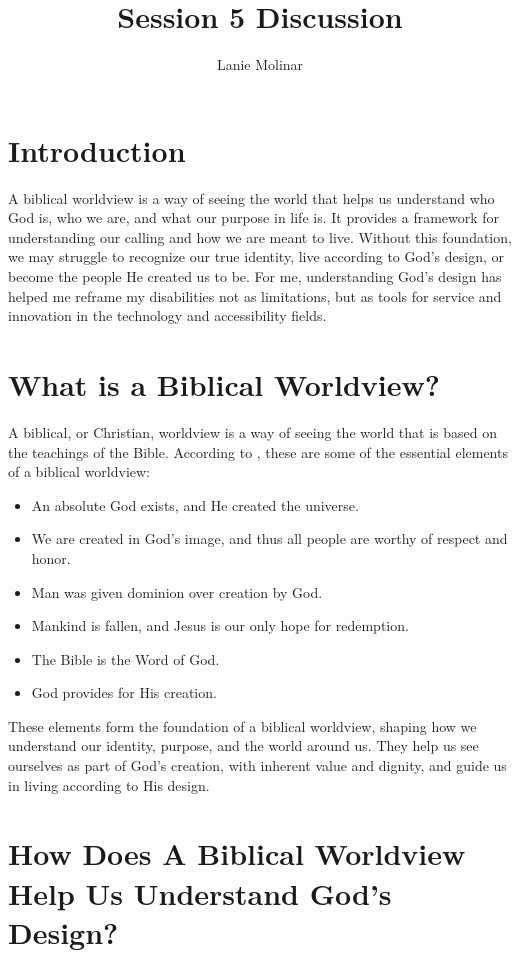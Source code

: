 \documentclass[stu,12pt,floatsintext]{apa7}
\title{Session 5 Discussion}
\author{Lanie Molinar}
\begin{document}
\maketitle
\thispagestyle{plain}
\pagestyle{plain}

\section{Introduction}

A biblical worldview is a way of seeing the world that helps us understand who God is, who we are, and what our purpose in life is. It provides a framework for understanding our calling and how we are meant to live. Without this foundation, we may struggle to recognize our true identity, live according to God’s design, or become the people He created us to be. For me, understanding God’s design has helped me reframe my disabilities not as limitations, but as tools for service and innovation in the technology and accessibility fields.

\section{What is a Biblical Worldview?}

A biblical, or Christian, worldview is a way of seeing the world that is based on the teachings of the Bible. According to \textcite{slickWhatAreChristian2008}, these are some of the essential elements of a biblical worldview:
\begin{itemize}
    \item An absolute God exists, and He created the universe.
    \item We are created in God's image, and thus all people are worthy of respect and honor.
    \item Man was given dominion over creation by God.
    \item Mankind is fallen, and Jesus is our only hope for redemption.
    \item The Bible is the Word of God.
    \item God provides for His creation.
\end{itemize}

These elements form the foundation of a biblical worldview, shaping how we understand our identity, purpose, and the world around us. They help us see ourselves as part of God's creation, with inherent value and dignity, and guide us in living according to His design.

\section{How Does A Biblical Worldview Help Us Understand God's Design?}
\end{document}
